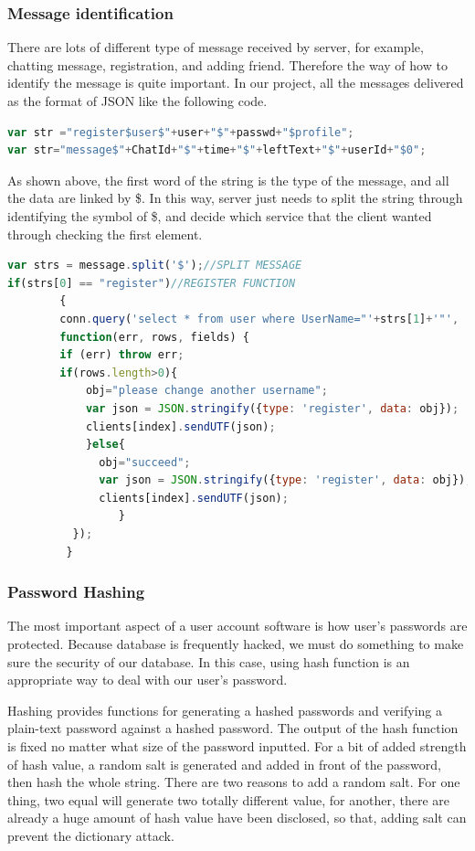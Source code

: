 \documentclass[a4paper,11pt]{article}
\begin{document}
\subsubsection{Message identification}
There are lots of different type of message received by server, for example, chatting message, registration, and adding friend. Therefore the way of how to identify the message is quite important. In our project, all the messages delivered as the format of JSON like the following code.
\begin{lstlisting}[language=javascript]
var str ="register$user$"+user+"$"+passwd+"$profile";
var str="message$"+ChatId+"$"+time+"$"+leftText+"$"+userId+"$0";
\end{lstlisting}
As shown above, the first word of the string is the type of the message, and all the data are linked by \$. In this way, server just needs to split the string through identifying the symbol of \$, and decide which service that the client wanted through checking the first element.
\begin{lstlisting}[language=javascript]
var strs = message.split('$');//SPLIT MESSAGE
if(strs[0] == "register")//REGISTER FUNCTION
        {
        conn.query('select * from user where UserName="'+strs[1]+'"',
        function(err, rows, fields) {
        if (err) throw err;
        if(rows.length>0){
            obj="please change another username";
            var json = JSON.stringify({type: 'register', data: obj});
            clients[index].sendUTF(json);
            }else{
              obj="succeed";
              var json = JSON.stringify({type: 'register', data: obj});
              clients[index].sendUTF(json);
                 }
          });
         }
\end{lstlisting}
\subsubsection{Password Hashing}
The most important aspect of a user account software is how user’s passwords are protected. Because database is frequently hacked, we must do something to make sure the security of our database. In this case, using hash function is an appropriate way to deal with our user’s password.

Hashing provides functions for generating a hashed passwords and verifying a plain-text password against a hashed password. The output of the hash function is fixed no matter what size of the password inputted. For a bit of added strength of hash value, a random salt is generated and added in front of the password, then hash the whole string. There are two reasons to add a random salt. For one thing, two equal will generate two totally different value, for another, there are already a huge amount of hash value have been disclosed, so that, adding salt can prevent the dictionary attack.
\end{document}
